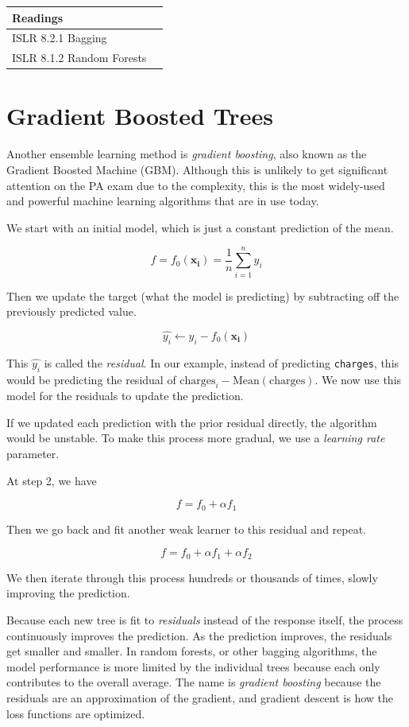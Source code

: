 \documentclass[
  openany]{book}
\begin{document}
\begin{longtable}[]{@{}ll@{}}
\toprule
Readings &\tabularnewline
\midrule
\endhead
ISLR 8.2.1 Bagging &\tabularnewline
ISLR 8.1.2 Random Forests &\tabularnewline
\bottomrule
\end{longtable}

\hypertarget{gradient-boosted-trees}{%
\section{Gradient Boosted Trees}\label{gradient-boosted-trees}}

Another ensemble learning method is \emph{gradient boosting}, also known as the Gradient Boosted Machine (GBM). Although this is unlikely to get significant attention on the PA exam due to the complexity, this is the most widely-used and powerful machine learning algorithms that are in use today.

We start with an initial model, which is just a constant prediction of the mean.

\[f = f_0(\mathbf{x_i}) = \frac{1}{n}\sum_{i=1}^ny_i\]

Then we update the target (what the model is predicting) by subtracting off the previously predicted value.

\[ \hat{y_i} \leftarrow y_i - f_0(\mathbf{x_i})\]

This \(\hat{y_i}\) is called the \emph{residual}. In our example, instead of predicting \texttt{charges}, this would be predicting the residual of \(\text{charges}_i - \text{Mean}(\text{charges})\). We now use this model for the residuals to update the prediction.

If we updated each prediction with the prior residual directly, the algorithm would be unstable. To make this process more gradual, we use a \emph{learning rate} parameter.

At step 2, we have

\[f = f_0 + \alpha f_1\]

Then we go back and fit another weak learner to this residual and repeat.

\[f = f_0 + \alpha f_1 + \alpha f_2\]

We then iterate through this process hundreds or thousands of times, slowly improving the prediction.

Because each new tree is fit to \emph{residuals} instead of the response itself, the process continuously improves the prediction. As the prediction improves, the residuals get smaller and smaller. In random forests, or other bagging algorithms, the model performance is more limited by the individual trees because each only contributes to the overall average. The name is \emph{gradient boosting} because the residuals are an approximation of the gradient, and gradient descent is how the loss functions are optimized.
\end{document}
